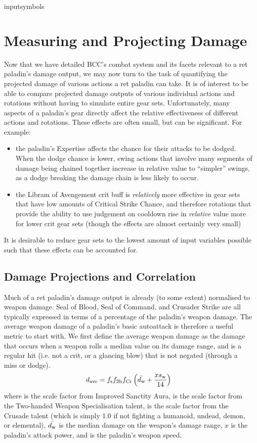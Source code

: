 input{symbols}

\section{Measuring and Projecting Damage}
Now that we have detailed BCC's combat system and its facets relevant to a ret paladin's damage output, we may now turn to the task of quantifying the projected damage of various actions a ret paladin can take.
It is of interest to be able to compare projected damage outputs of various individual actions and rotations without having to simulate entire gear sets.
Unfortunately, many aspects of a paladin's gear directly affect the relative effectiveness of different actions and rotations.
These effects are often small, but can be significant.
For example:
\begin{itemize}
	\item the paladin's Expertise affects the chance for their attacks to be dodged. When the dodge chance is lower, swing actions that involve many segments of damage being chained together increase in relative value to ``simpler'' swings, as a dodge breaking the damage chain is less likely to occur.
	\item the Libram of Avengement crit buff is \emph{relatively} more effective in gear sets that have low amounts of Critical Strike Chance, and therefore rotations that provide the ability to use judgement on cooldown rise in \emph{relative} value more for lower crit gear sets (though the effects are almost certainly very small)
\end{itemize}
It is desirable to reduce gear sets to the lowest amount of input variables possible such that these effects can be accounted for.

\subsection{Damage Projections and Correlation}
Much of a ret paladin's damage output is already (to some extent) normalised to weapon damage.	
Seal of Blood, Seal of Command, and Crusader Strike are all typically expressed in terms of a percentage of the paladin's weapon damage.
The average weapon damage of a paladin's basic autoattack is therefore a useful metric to start with.
We first define the average weapon damage as the damage that occurs when a weapon rolls a median value on its damage range, and is a regular hit (i.e. not a crit, or a glancing blow) that is not negated (through a miss or dodge).
\begin{equation}
	d_{\mathrm{ave}}  = f_{\mathrm{s}}  f_{\mathrm{2h}}  f_{\mathrm{Cr}}  \left( \bar{d_\mathrm{w} } + \frac{xs_\mathrm{w} }{14} \right)
\end{equation}
where \fimpsanc is the scale factor from Improved Sanctity Aura, \ftwoh is the scale factor from the Two-handed Weapon Specialisation talent, \fcrusade is the scale factor from the Crusade talent (which is simply 1.0 if not fighting a humanoid, undead, demon, or elemental), $\bar{d_\mathrm{w} }$ is the median damage on the weapon's damage range, $x$ is the paladin's attack power, and \ws is the paladin's weapon speed.

